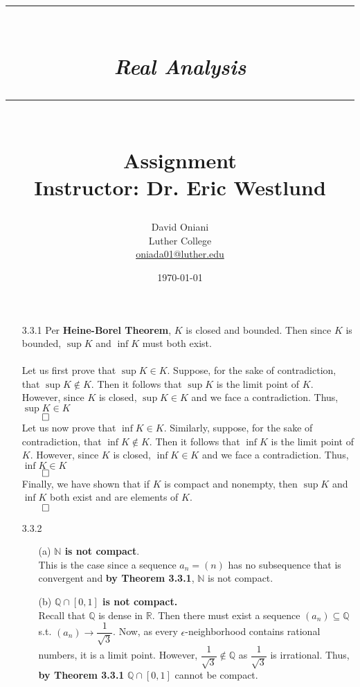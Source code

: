 \documentclass[11pt]{article}
\author{David Oniani\\
        Luther College\\
        \href{mailto:oniada01@luther.edu}{oniada01@luther.edu}}
\title{\rule{\paperwidth - 150pt}{1pt}\textbf{\\\textit{Real Analysis}\\}\rule
{\paperwidth - 150pt}{1pt}\\\textbf{Assignment \textnumero6}\\{\normalsize
Instructor: Dr. Eric Westlund}}
\date{\today}
\newcommand{\nats}{\mathbb{N}}
\newcommand{\reals}{\mathbb{R}}
\newcommand{\rats}{\mathbb{Q}}
\begin{document}
\maketitle

%
%
%
%

\begin{itemize}
    \item[3.3.1]
        Per \textbf{Heine-Borel Theorem}, $K$ is closed and bounded. Then since
        $K$ is bounded, $\sup{K}$ and $\inf{K}$ must both exist.
        \\
        \\
        Let us first prove that $\sup{K} \in K$. Suppose, for the sake of
        contradiction, that $\sup{K} \notin K$. Then it follows that $\sup{K}$
        is the limit point of $K$. However, since $K$ is closed, $\sup{K} \in
        K$ and we face a contradiction. Thus, $\sup{K} \in K$\\
        $\qed$
        \\
        Let us now prove that $\inf{K} \in K$. Similarly, suppose, for the sake
        of contradiction, that $\inf{K} \notin K$. Then it follows that
        $\inf{K}$ is the limit point of $K$. However, since $K$ is closed,
        $\inf{K} \in K$ and we face a contradiction. Thus, $\inf{K} \in K$\\
        $\qed$
        \\
        Finally, we have shown that if $K$ is compact and nonempty, then
        $\sup{K}$ and $\inf{K}$ both exist and are elements of $K$.\\
        $\qed$

    \newpage

    \item[3.3.2]
        \begin{itemize}
            \item[(a)]
                \textbf{$\nats$ is not compact}.
                \\
                This is the case since a sequence $a_n = (n)$ has no
                subsequence that is convergent and \textbf{by Theorem 3.3.1},
                $\nats$ is not compact.

            \item[(b)]
                \textbf{$\rats \cap [0, 1]$ is not compact.}
                \\
                Recall that $\rats$ is dense in $\reals$. Then there must exist
                a sequence $(a_n) \subseteq \rats$ s.t. $(a_n) \to
                \dfrac{1}{\sqrt{3}}$. Now, as every $\epsilon$-neighborhood
                contains rational numbers, it is a limit point. However,
                $\dfrac{1}{\sqrt{3}} \notin \rats$ as $\dfrac{1}{\sqrt{3}}$ is
                irrational. Thus, \textbf{by Theorem 3.3.1} $\rats \cap [0, 1]$
                cannot be compact.


\end{itemize}
\end{itemize}
\end{document}
